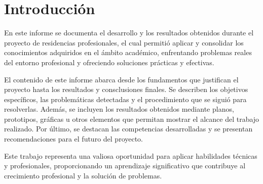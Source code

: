 \chapter{Introducción}
En este informe se documenta el desarrollo y los resultados obtenidos durante el proyecto de residencias profesionales, el cual permitió aplicar y consolidar los conocimientos adquiridos en el ámbito académico, enfrentando problemas reales del entorno profesional y ofreciendo soluciones prácticas y efectivas.

El contenido de este informe abarca desde los fundamentos que justifican el proyecto hasta los resultados y consclusiones finales. Se describen los objetivos específicos, las problemáticas detectadas y el procedimiento que se siguió para resolverlas. Además, se incluyen los resultados obtenidos mediante planos, prototipos, gráficas u otros elementos que permitan mostrar el alcance del trabajo realizado. Por último, se destacan las competencias desarrolladas y se presentan recomendaciones para el futuro del proyecto.

Este trabajo representa una valiosa oportunidad para aplicar habilidades técnicas y profesionales, proporcionando un aprendizaje significativo que contribuye al crecimiento profesional y la solución de problemas.